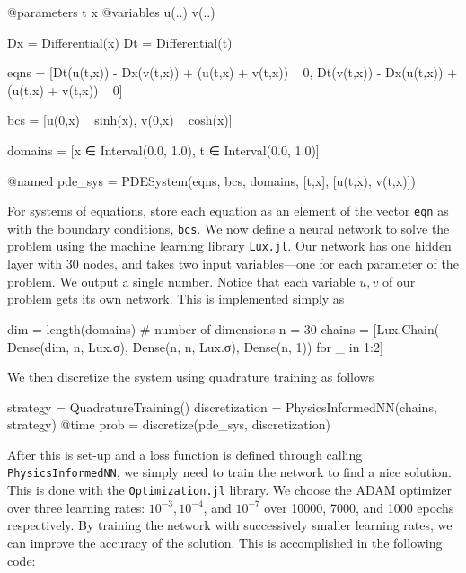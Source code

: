 \documentclass{CUP-JNL-DTM}%
\theoremstyle{definition}
\numberwithin{equation}{section}
\begin{document}
\begin{jllisting}
@parameters t x
@variables u(..) v(..)

Dx = Differential(x)
Dt = Differential(t)

eqns = [Dt(u(t,x)) - Dx(v(t,x)) + (u(t,x) + v(t,x)) ~ 0,
        Dt(v(t,x)) - Dx(u(t,x)) + (u(t,x) + v(t,x)) ~ 0]

bcs = [u(0,x) ~ sinh(x), v(0,x) ~ cosh(x)]

domains = [x ∈ Interval(0.0, 1.0),
            t ∈ Interval(0.0, 1.0)]

@named pde_sys = PDESystem(eqns, bcs, domains, [t,x], [u(t,x), v(t,x)])
\end{jllisting}
For systems of equations, store each equation as an element of the vector \texttt{eqn} as with the boundary conditions, \texttt{bcs}. We now define a neural network to solve the problem using the machine learning library \texttt{Lux.jl}. Our network has one hidden layer with 30 nodes, and takes two input variables---one for each parameter of the problem. We output a single number. Notice that each variable $u,v$ of our problem gets its own network. This is implemented simply as

\begin{jllisting}
dim = length(domains) # number of dimensions
n = 30
chains = [Lux.Chain(
            Dense(dim, n, Lux.σ), 
            Dense(n, n, Lux.σ), 
            Dense(n, 1)) for _ in 1:2]
\end{jllisting}
We then discretize the system using quadrature training as follows

\begin{jllisting}
strategy = QuadratureTraining()
discretization = PhysicsInformedNN(chains, strategy)
@time prob = discretize(pde_sys, discretization)
\end{jllisting}
After this is set-up and a loss function is defined through calling \texttt{PhysicsInformedNN}, we simply need to train the network to find a nice solution. This is done with the \texttt{Optimization.jl} library. We choose the ADAM optimizer over three learning rates: $10^{-3}, 10^{-4}$, and $10^{-7}$ over 10000, 7000, and 1000 epochs respectively. By training the network with successively smaller learning rates, we can improve the accuracy of the solution. This is accomplished in the following code:
\end{document}
